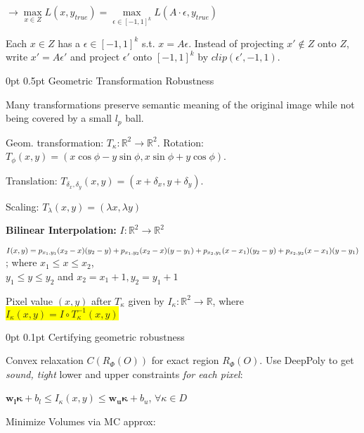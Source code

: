 \documentclass[11pt,landscape,a4paper,fleqn]{article}
\makeatletter
\renewcommand{\section}{\@startsection{section}{1}{0mm}%
                                {0pt}%
                                {0.5pt}%
                                {\color{myorange}\sffamily\small\bfseries}}
\renewcommand{\subsection}{\@startsection{subsection}{1}{0mm}%
                                {0pt}%
                                {0.1pt}%
                            	{\color{myorange2}\sffamily\small}}
\newcommand{\mhl}[1]{\setlength{\fboxsep}{0pt}\colorbox{yellow}{#1}}
\makeatother
\begin{document}
\begin{multicols*}{4}
$\rightarrow \max\limits_{x \in Z} L(x, y_{true}) = \max\limits_{\epsilon \in [-1,1]^k} L(A \cdot \epsilon, y_{true})$

Each $x \in Z$ has a $\epsilon \in [-1,1]^k$ s.t. $x = A \epsilon$. Instead of projecting $x' \notin Z$ onto $Z$, write $x' = A \epsilon'$ and project $\epsilon'$ onto $[-1,1]^k$ by $clip(\epsilon', -1, 1)$.

\section{Geometric Transformation Robustness}

Many transformations preserve semantic meaning of the original image while not being covered by a small $l_p$ ball.

Geom. transformation: $T_{\kappa}: \mathbb{R}^2 \rightarrow \mathbb{R}^2$. Rotation: $T_\phi(x,y) = (x\cos \phi - y\sin \phi, x \sin \phi + y\cos \phi)$.

Translation: $T_{\delta_x, \delta_y}(x,y) = (x + \delta_x, y + \delta_y)$.

Scaling: $T_\lambda (x,y) = (\lambda x, \lambda y)$

\textbf{Bilinear Interpolation:} $I: \mathbb{R}^2 \rightarrow \mathbb{R}^2$

$I(x,y) = p_{x_1,y_1} (x_2 - x)(y_2 - y)\\ + p_{x_1,y_2}(x_2 - x)(y - y_1) + p_{x_2,y_1}(x - x_1)(y_2 - y)\\ + p_{x_2,y_2} (x - x_1)(y - y_1)$; where $x_1 \leq x \leq x_2$,\\
$y_1 \leq y \leq y_2$ and $x_2 = x_1 + 1, y_2 = y_1 + 1$
\vspace*{1mm}

Pixel value $(x,y)$ after $T_\kappa$ given by $I_\kappa : \mathbb{R}^2 \rightarrow \mathbb{R}$, where \mhl{$I_\kappa(x,y) = I \circ T_\kappa^{-1}(x,y)$}

\subsection{Certifying geometric robustness}

Convex relaxation $C(R_\Phi(O))$ for exact region $R_\Phi(O)$. Use DeepPoly to get \textit{sound, tight} lower and upper constraints \textit{for each pixel}:

$\mathbf{w_l}\mathbf{\kappa} + b_l \leq I_\kappa(x,y) \leq \mathbf{w_u}\mathbf{\kappa} + b_u$, $\forall \kappa \in D$

Minimize Volumes via MC approx:


\end{multicols*}
\end{document}
